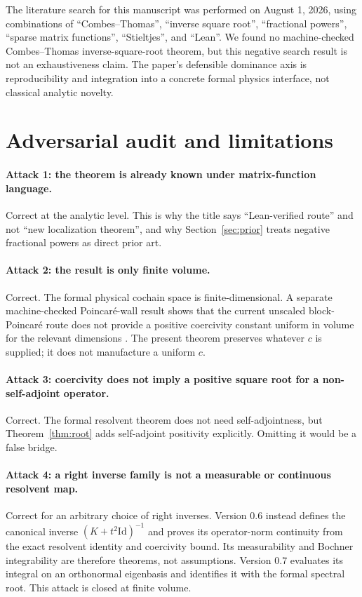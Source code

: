 \documentclass[11pt]{article}
\theoremstyle{definition}
\newcommand{\Id}{\mathrm{Id}}
\begin{document}
The literature search for this manuscript was performed on August 1, 2026,
using combinations of ``Combes--Thomas'', ``inverse square root'',
``fractional powers'', ``sparse matrix functions'', ``Stieltjes'', and
``Lean''.  We found no machine-checked Combes--Thomas inverse-square-root
theorem, but this negative search result is not an exhaustiveness claim.  The
paper's defensible dominance axis is reproducibility and integration into a
concrete formal physics interface, not classical analytic novelty.

\section{Adversarial audit and limitations}\label{sec:audit}

\paragraph{Attack 1: the theorem is already known under matrix-function
language.}  Correct at the analytic level.  This is why the title says
``Lean-verified route'' and not ``new localization theorem'', and why
Section~\ref{sec:prior} treats negative fractional powers as direct prior art.

\paragraph{Attack 2: the result is only finite volume.}  Correct.  The formal
physical cochain space is finite-dimensional.  A separate machine-checked
Poincar\'e-wall result shows that the current unscaled block-Poincar\'e route
does not provide a positive coercivity constant uniform in volume for the
relevant dimensions \cite{ErikssonPoincare}.  The present theorem preserves
whatever $c$ is supplied; it does not manufacture a uniform $c$.

\paragraph{Attack 3: coercivity does not imply a positive square root for a
non-self-adjoint operator.}  Correct.  The formal resolvent theorem does not
need self-adjointness, but Theorem~\ref{thm:root} adds self-adjoint positivity
explicitly.  Omitting it would be a false bridge.

\paragraph{Attack 4: a right inverse family is not a measurable or continuous
resolvent map.}  Correct for an arbitrary choice of right inverses.  Version
0.6 instead defines the canonical inverse $(K+t^2\Id)^{-1}$ and proves its
operator-norm continuity from the exact resolvent identity and coercivity
bound.  Its measurability and Bochner integrability are therefore theorems,
not assumptions.  Version 0.7 evaluates its integral on an orthonormal
eigenbasis and identifies it with the formal spectral root.  This attack is
closed at finite volume.
\end{document}
